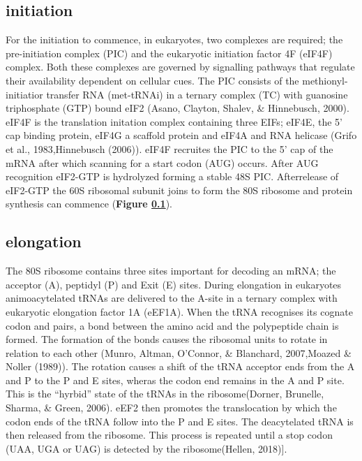\documentclass[12pt,openany]{book}
\begin{document}
\clearpage

\subsection{initiation} \label{initiation}

For the initiation to commence, in eukaryotes, two complexes are
required; the pre-initiation complex (PIC) and the eukaryotic initiation
factor 4F (eIF4F) complex. Both these complexes are governed by
signalling pathways that regulate their availability dependent on
cellular cues. The PIC consists of the methionyl-initiatior transfer RNA
(met-tRNAi) in a ternary complex (TC) with guanosine triphosphate (GTP)
bound eIF2 (Asano, Clayton, Shalev, \& Hinnebusch, 2000). eIF4F is the
translation initation complex containing three EIFs; eIF4E, the 5' cap
binding protein, eIF4G a scaffold protein and eIF4A and RNA helicase
(Grifo et al., 1983,Hinnebusch (2006)). eIF4F recruites the PIC to the
5' cap of the mRNA after which scanning for a start codon (AUG) occurs.
After AUG recognition eIF2-GTP is hydrolyzed forming a stable 48S PIC.
Afterrelease of eIF2-GTP the 60S ribosomal subunit joins to form the 80S
ribosome and protein synthesis can commence (\textbf{Figure
\ref{initiation}}).

\subsection{elongation}

The 80S ribosome contains three sites important for decoding an mRNA;
the acceptor (A), peptidyl (P) and Exit (E) sites. During elongation in
eukaryotes animoacytelated tRNAs are delivered to the A-site in a
ternary complex with eukaryotic elongation factor 1A (eEF1A). When the
tRNA recognises its cognate codon and pairs, a bond between the amino
acid and the polypeptide chain is formed. The formation of the bonds
causes the ribosomal units to rotate in relation to each other (Munro,
Altman, O'Connor, \& Blanchard, 2007,Moazed \& Noller (1989)). The
rotation causes a shift of the tRNA acceptor ends from the A and P to
the P and E sites, wheras the codon end remains in the A and P site.
This is the ``hyrbid'' state of the tRNAs in the ribosome(Dorner,
Brunelle, Sharma, \& Green, 2006). eEF2 then promotes the translocation
by which the codon ends of the tRNA follow into the P and E sites. The
deacytelated tRNA is then released from the ribosome. This process is
repeated until a stop codon (UAA, UGA or UAG) is detected by the
ribosome(Hellen, 2018){]}.
\end{document}
